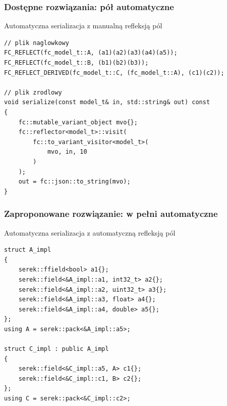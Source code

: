 \documentclass[12pt]{beamer}
\begin{document}
	\begin{frame}[fragile]
		\frametitle{Dostępne rozwiązania: pół automatyczne}

		Automatyczna serializacja z manualną refleksją pól

		\begin{lstlisting}[frame=single]
// plik naglowkowy
FC_REFLECT(fc_model_t::A, (a1)(a2)(a3)(a4)(a5));
FC_REFLECT(fc_model_t::B, (b1)(b2)(b3));
FC_REFLECT_DERIVED(fc_model_t::C, (fc_model_t::A), (c1)(c2));

// plik zrodlowy
void serialize(const model_t& in, std::string& out) const
{
	fc::mutable_variant_object mvo{};
	fc::reflector<model_t>::visit(
		fc::to_variant_visitor<model_t>(
			mvo, in, 10
		)
	);
	out = fc::json::to_string(mvo);
}
		\end{lstlisting}

	\end{frame}

	\begin{frame}[fragile]
		\frametitle{Zaproponowane rozwiązanie: w pełni automatyczne}

		Automatyczna serializacja z automatyczną refleksją pól

		\begin{lstlisting}[frame=single]
struct A_impl
{
	serek::ffield<bool> a1{};
	serek::field<&A_impl::a1, int32_t> a2{};
	serek::field<&A_impl::a2, uint32_t> a3{};
	serek::field<&A_impl::a3, float> a4{};
	serek::field<&A_impl::a4, double> a5{};
};
using A = serek::pack<&A_impl::a5>;

struct C_impl : public A_impl
{
	serek::field<&C_impl::a5, A> c1{};
	serek::field<&C_impl::c1, B> c2{};
};
using C = serek::pack<&C_impl::c2>;
		\end{lstlisting}

	\end{frame}
\end{document}
